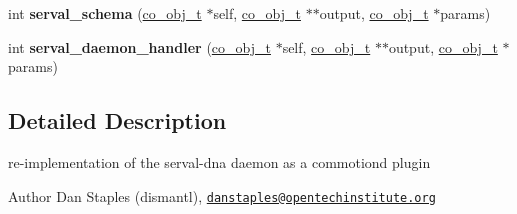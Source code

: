 \begin{DoxyCompactItemize}
\item 
\hypertarget{serval-dna_8h_a0e0920eff3548cf56da6e9f8c5c4e5ab}{int {\bfseries serval\+\_\+schema} (\hyperlink{structco__obj__t}{co\+\_\+obj\+\_\+t} $\ast$self, \hyperlink{structco__obj__t}{co\+\_\+obj\+\_\+t} $\ast$$\ast$output, \hyperlink{structco__obj__t}{co\+\_\+obj\+\_\+t} $\ast$params)}\label{serval-dna_8h_a0e0920eff3548cf56da6e9f8c5c4e5ab}

\item 
\hypertarget{serval-dna_8h_a31d498ab46d883bda2967eca577b8890}{int {\bfseries serval\+\_\+daemon\+\_\+handler} (\hyperlink{structco__obj__t}{co\+\_\+obj\+\_\+t} $\ast$self, \hyperlink{structco__obj__t}{co\+\_\+obj\+\_\+t} $\ast$$\ast$output, \hyperlink{structco__obj__t}{co\+\_\+obj\+\_\+t} $\ast$params)}\label{serval-dna_8h_a31d498ab46d883bda2967eca577b8890}

\end{DoxyCompactItemize}


\subsection{Detailed Description}
re-\/implementation of the serval-\/dna daemon as a commotiond plugin 

\begin{DoxyAuthor}{Author}
Dan Staples (dismantl), \href{mailto:danstaples@opentechinstitute.org}{\tt danstaples@opentechinstitute.\+org} 
\end{DoxyAuthor}


